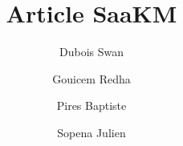\documentclass[9pt]{article}
\title{Article SaaKM}
\author{
        Dubois Swan \and Gouicem Redha \and Pires Baptiste \and Sopena Julien
}
\begin{document}
        
        \maketitle

        \begin{multicols}{2}
                
                        
                        
                        
                        
                
        \end{multicols}


        \printbibliography
\end{document}
